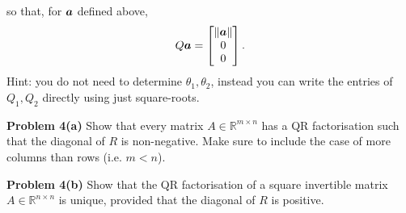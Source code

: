 \documentclass[12pt,a4paper]{article}
\def\bbR{ {\mathbb R} }
\def\a{ {\vc a} }
\begin{document}
so that, for $\ensuremath{\bm{\a}}$ defined above,
\[
Q \ensuremath{\bm{\a}}  = \begin{bmatrix} \|\ensuremath{\bm{\a}}\| \\ 0 \\ 0 \end{bmatrix}.
\]
Hint: you do not need to determine $\ensuremath{\theta}_1, \ensuremath{\theta}_2$, instead you can write the entries of  $Q_1, Q_2$  directly using just square-roots. 

\textbf{Problem 4(a)} Show that every matrix $A \ensuremath{\in} \ensuremath{\bbR}^{m \ensuremath{\times} n}$ has a  QR factorisation such that the diagonal of $R$ is non-negative. Make sure to include the case of more columns than rows (i.e. $m < n$). 

\textbf{Problem 4(b)} Show that the QR factorisation of a square invertible matrix $A \ensuremath{\in} \ensuremath{\bbR}^{n \ensuremath{\times} n}$ is unique, provided that the diagonal of $R$ is positive.
\end{document}

